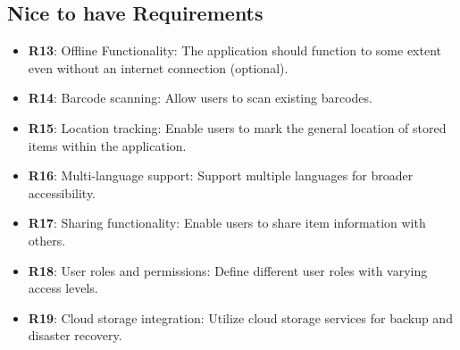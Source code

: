 \documentclass[hidelinks, 12pt, a4paper]{article}
\begin{document}
\subsection{Nice to have Requirements}
\begin{itemize}
    \item \textbf{R13}: {Offline Functionality: The application should function to some extent even without an internet connection (optional).}

    \item \textbf{R14}: {Barcode scanning: Allow users to scan existing barcodes.}

    \item \textbf{R15}: {Location tracking: Enable users to mark the general location of stored items within the application.}

    \item \textbf{R16}: {Multi-language support: Support multiple languages for broader accessibility.}

    \item \textbf{R17}: {Sharing functionality: Enable users to share item information with others.}

    \item \textbf{R18}: {User roles and permissions: Define different user roles with varying access levels.}

    \item \textbf{R19}: {Cloud storage integration: Utilize cloud storage services for backup and disaster
    recovery.}
\end{itemize}
\end{document}
